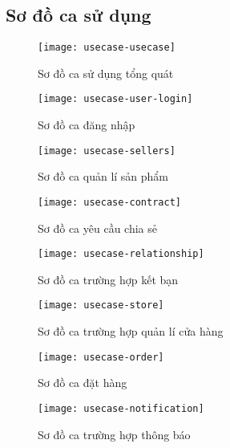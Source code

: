\subsection{Sơ đồ ca sử dụng}

\begin{figure}[h!]
	\centering
	\texttt{[image: usecase-usecase]}
	\caption{Sơ đồ ca sử dụng tổng quát}
\end{figure}

\begin{figure}[h!]
	\begin{center}	
		\texttt{[image: usecase-user-login]}
		\caption{Sơ đồ ca đăng nhập}
	\end{center}
\end{figure}


\begin{figure}[h!]
	\begin{center}	
		\texttt{[image: usecase-sellers]}
		\caption{Sơ đồ ca quản lí sản phẩm}
	\end{center}
\end{figure}


\begin{figure}[h!]
	\begin{center}	
		\texttt{[image: usecase-contract]}
		\caption{Sơ đồ ca yêu cầu chia sẻ}
	\end{center}
\end{figure}


\begin{figure}[h!]
	\begin{center}	
		\texttt{[image: usecase-relationship]}
		\caption{Sơ đồ ca trường hợp kết bạn}
	\end{center}
\end{figure}



\begin{figure}[h!]
	\begin{center}	
		\texttt{[image: usecase-store]}
		\caption{Sơ đồ ca trường hợp quản lí cửa hàng}
	\end{center}
\end{figure}

\begin{figure}[h!]
	\begin{center}	
		\texttt{[image: usecase-order]}
		\caption{Sơ đồ ca đặt hàng}
	\end{center}
\end{figure}


\begin{figure}[h!]
	\begin{center}	
		\texttt{[image: usecase-notification]}
		\caption{Sơ đồ ca trường hợp thông báo}
	\end{center}
\end{figure}
